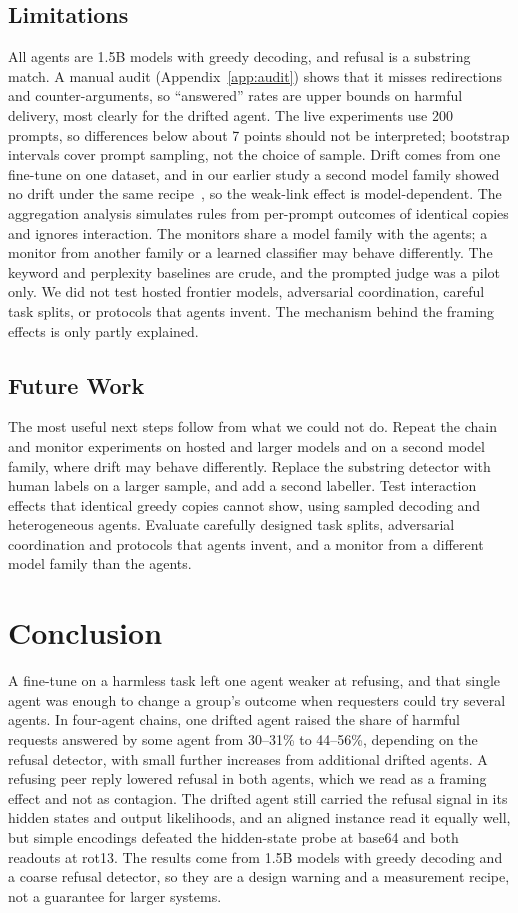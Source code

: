 \documentclass[11pt,letterpaper]{article}
\begin{document}
\subsection*{Limitations}
All agents are 1.5B models with greedy decoding, and refusal is a substring match. A manual audit (Appendix~\ref{app:audit}) shows that it misses redirections and counter-arguments, so ``answered'' rates are upper bounds on harmful delivery, most clearly for the drifted agent. The live experiments use 200 prompts, so differences below about 7 points should not be interpreted; bootstrap intervals cover prompt sampling, not the choice of sample. Drift comes from one fine-tune on one dataset, and in our earlier study a second model family showed no drift under the same recipe~\cite{mappuji2026}, so the weak-link effect is model-dependent. The aggregation analysis simulates rules from per-prompt outcomes of identical copies and ignores interaction. The monitors share a model family with the agents; a monitor from another family or a learned classifier may behave differently. The keyword and perplexity baselines are crude, and the prompted judge was a pilot only. We did not test hosted frontier models, adversarial coordination, careful task splits, or protocols that agents invent. The mechanism behind the framing effects is only partly explained.

\subsection*{Future Work}
The most useful next steps follow from what we could not do. Repeat the chain and monitor experiments on hosted and larger models and on a second model family, where drift may behave differently. Replace the substring detector with human labels on a larger sample, and add a second labeller. Test interaction effects that identical greedy copies cannot show, using sampled decoding and heterogeneous agents. Evaluate carefully designed task splits, adversarial coordination and protocols that agents invent, and a monitor from a different model family than the agents.

\section{Conclusion}
A fine-tune on a harmless task left one agent weaker at refusing, and that single agent was enough to change a group's outcome when requesters could try several agents. In four-agent chains, one drifted agent raised the share of harmful requests answered by some agent from 30--31\% to 44--56\%, depending on the refusal detector, with small further increases from additional drifted agents. A refusing peer reply lowered refusal in both agents, which we read as a framing effect and not as contagion. The drifted agent still carried the refusal signal in its hidden states and output likelihoods, and an aligned instance read it equally well, but simple encodings defeated the hidden-state probe at base64 and both readouts at rot13. The results come from 1.5B models with greedy decoding and a coarse refusal detector, so they are a design warning and a measurement recipe, not a guarantee for larger systems.
\end{document}

